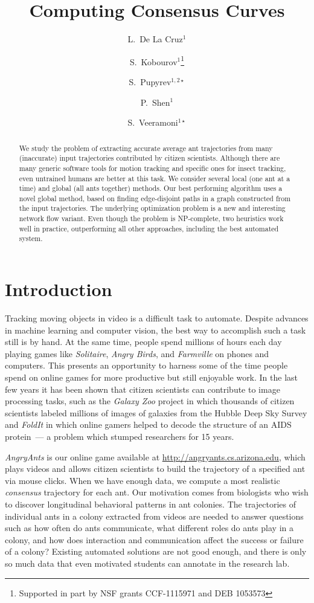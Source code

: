 \documentclass[runningheads]{llncs}
\author{
L.~De La Cruz$^1$ \and
S.~Kobourov$^1$\thanks{Supported in part by NSF grants CCF-1115971 and DEB 1053573} \and
S.~Pupyrev$^{1,2\star}$ \and
P.~Shen$^1$ \and
S.~Veeramoni$^{1\star}$
}
\institute{
$^1$ Department of Computer Science, University of Arizona, Tucson, AZ, USA\\
$^2$ Institute of Mathematics and Computer Science, Ural Federal University, Ekaterinburg, Russia
}
\title{Computing Consensus Curves}
\begin{document}
\maketitle

\begin{abstract}
We study the problem of extracting accurate average ant
trajectories from many (inaccurate) input trajectories
contributed by citizen scientists. Although there are many generic
software tools for motion tracking and specific ones for insect
tracking, even untrained humans are better at this task.
We consider several local (one ant at a time) and global (all ants
together) methods. Our best performing algorithm uses a novel global
method, based on finding edge-disjoint paths in a graph constructed from
the input trajectories. The underlying optimization problem is a new
and interesting network flow variant.
Even though the problem is NP-complete, two heuristics work well in practice,
outperforming all other approaches,
including the best automated system.
\end{abstract}


\section{Introduction}
\label{sec:intro}
Tracking moving objects in video is a difficult task to automate. Despite advances in
machine learning and computer vision, the best way to accomplish such
a task still is by hand. At the same time, people spend millions of hours each day
playing games like \emph{Solitaire}, \emph{Angry Birds}, and \emph{Farmville} on phones and
computers. This presents
an opportunity to harness some of the time people spend on online
games for more productive but still
enjoyable work.
In the last few years it has been shown that citizen
scientists can contribute to image processing tasks, such as the
\emph{Galaxy Zoo} project in which thousands of citizen
scientists labeled millions of images of galaxies from
the Hubble Deep Sky Survey and \emph{FoldIt} in
which online gamers helped to decode the structure of an AIDS protein~---
a problem which stumped researchers for 15 years.

\emph{AngryAnts} is our online game available at \url{http://angryants.cs.arizona.edu},
which plays videos and allows citizen scientists to build the
trajectory of a specified ant via mouse clicks.
When we have enough data, we compute a
most realistic {\em consensus} trajectory for each ant.
Our motivation comes from biologists who wish to discover
longitudinal behavioral patterns in ant colonies.
The trajectories of individual ants in a colony extracted from videos
are needed to answer
questions such as how often do ants communicate, what different roles
do ants play in a colony, and how does interaction and communication affect
the success or failure of a colony? Existing automated solutions are
not good enough, and there is
only so much data that even motivated students can annotate in the
research lab.
\end{document}
